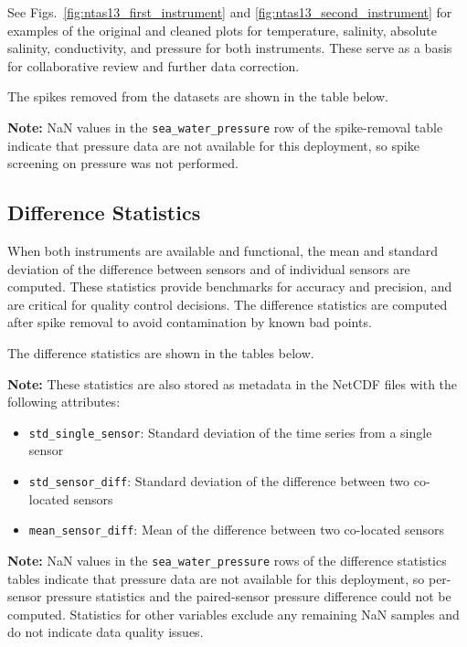See Figs.~\ref{fig:ntas13_first_instrument} and \ref{fig:ntas13_second_instrument} for examples of the original and cleaned plots for temperature, salinity, absolute salinity, conductivity, and pressure for both instruments.
These serve as a basis for collaborative review and further data correction.

The spikes removed from the datasets are shown in the table below.



\textbf{Note:} NaN values in the \texttt{sea\_water\_pressure} row of the spike-removal table indicate that pressure data are not available for this deployment, so spike screening on pressure was not performed.

\subsection{Difference Statistics}
When both instruments are available and functional, 
the mean and standard deviation of the difference between sensors and of individual sensors are computed. 
These statistics provide benchmarks for accuracy and precision, and are critical for quality control decisions.
The difference statistics are computed after spike removal to avoid contamination by known bad points.

The difference statistics are shown in the tables below.



\textbf{Note:} These statistics are also stored as metadata in the NetCDF files with the following attributes:
\begin{itemize}
\item \texttt{std\_single\_sensor}: Standard deviation of the time series from a single sensor
\item \texttt{std\_sensor\_diff}: Standard deviation of the difference between two co-located sensors
\item \texttt{mean\_sensor\_diff}: Mean of the difference between two co-located sensors
\end{itemize}

\textbf{Note:} NaN values in the \texttt{sea\_water\_pressure} rows of the difference statistics tables indicate that pressure data are not available for this deployment, so per-sensor pressure statistics and the paired-sensor pressure difference could not be computed. Statistics for other variables exclude any remaining NaN samples and do not indicate data quality issues.

